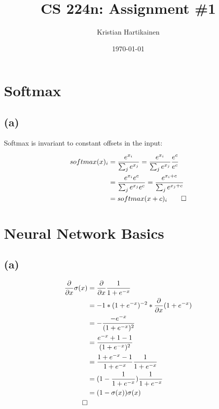 \documentclass[11pt]{article}
\title{ CS 224n: Assignment \#1 }
\author{Kristian Hartikainen}
\date{\today}
\begin{document}
\maketitle

\section{Softmax}
\subsection*{(a)}
Softmax is invariant to constant offsets in the input:

\begin{equation*}
  \label{eq:1}
  \begin{split}
    softmax(x)_{i} &= \frac{ e^{ x_{i} }       }{ \sum_{j}{ e^{ x_{j} }} }
                    = \frac{ e^{ x_{i} }       }{ \sum_{j}{ e^{ x_{j} }}} \frac{e^{c}}{{e^{c}}} \\
                 &= \frac{ e^{ x_{i} } e^{c} }{ \sum_{j}{ e^{ x_{j} } e^{c}}}
                  = \frac{ e^{ x_{i} + c }   }{ \sum_{j}{ e^{ x_{j} + c } } } \\
                 &= softmax(x + c)_{i}
  \qedhere
  \end{split}
\end{equation*}

\section{Neural Network Basics}
\subsection*{(a)}
\begin{equation*}
  \label{eq:2}
  \begin{split}
    \frac{ \partial }{ \partial x } \sigma(x)
      &= \frac{ \partial }{ \partial x } \frac{ 1 }{ 1 + e^{-x} } \\
      &= -1*(1 + e^{-x})^{-2} * \frac{ \partial }{ \partial x } (1+e^{-x}) \\
      &= -\frac{ -e^{-x} }{ (1 + e^{-x})^{2} } \\
      &=  \frac{ e^{-x} + 1 - 1 }{ (1 + e^{-x})^{2} } \\
      &=  \frac{ 1 + e^{-x} - 1 }{ 1 + e^{-x} } \frac{ 1 }{ 1 + e^{-x} } \\
      &=  (1 - \frac{ 1 }{ 1 + e^{-x} }) \frac{ 1 }{ 1 + e^{-x} } \\
      &=  (1 - \sigma(x)) \sigma(x) \\
  \qedhere
  \end{split}
\end{equation*}
\end{document}
